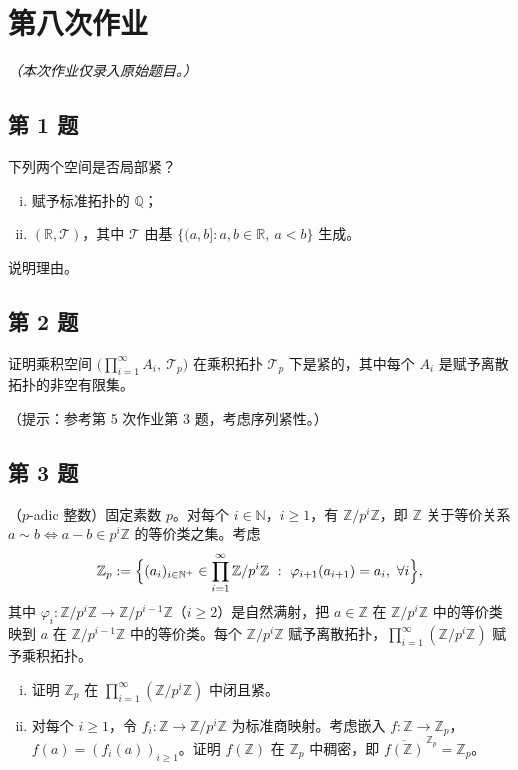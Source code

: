 \documentclass[11pt,a4paper]{article}
\newcommand{\R}{\mathbb{R}}
\newcommand{\Q}{\mathbb{Q}}
\newcommand{\Z}{\mathbb{Z}}
\newcommand{\N}{\mathbb{N}}
\theoremstyle{definition}
\begin{document}
\section{第八次作业}

\textit{（本次作业仅录入原始题目。）}

\subsection{第 1 题}

下列两个空间是否局部紧？
\begin{enumerate}[(i)]
  \item 赋予标准拓扑的 $\Q$；
  \item $(\R, \mathcal{T})$，其中 $\mathcal{T}$ 由基 $\{(a,b] : a, b \in \R,\ a < b\}$ 生成。
\end{enumerate}
说明理由。

\subsection{第 2 题}

证明乘积空间 $\bigl(\prod_{i=1}^{\infty} A_i,\ \mathcal{T}_p\bigr)$ 在乘积拓扑 $\mathcal{T}_p$ 下是紧的，其中每个 $A_i$ 是赋予离散拓扑的非空有限集。

（提示：参考第 5 次作业第 3 题，考虑序列紧性。）

\subsection{第 3 题}

（$p$-adic 整数）固定素数 $p$。对每个 $i \in \N$，$i \ge 1$，有 $\Z/p^i\Z$，即 $\Z$ 关于等价关系 $a \sim b \iff a - b \in p^i\Z$ 的等价类之集。考虑
\[
  \Z_p := \Bigl\{(a_i)_{i \in \N^+} \in \prod_{i=1}^{\infty} \Z/p^i\Z \ :\ \varphi_{i+1}(a_{i+1}) = a_i,\ \forall i \Bigr\},
\]
其中 $\varphi_i : \Z/p^i\Z \to \Z/p^{i-1}\Z$（$i \ge 2$）是自然满射，把 $a \in \Z$ 在 $\Z/p^i\Z$ 中的等价类映到 $a$ 在 $\Z/p^{i-1}\Z$ 中的等价类。每个 $\Z/p^i\Z$ 赋予离散拓扑，$\prod_{i=1}^{\infty}(\Z/p^i\Z)$ 赋予乘积拓扑。
\begin{enumerate}[(i)]
  \item 证明 $\Z_p$ 在 $\prod_{i=1}^{\infty}(\Z/p^i\Z)$ 中闭且紧。
  \item 对每个 $i \ge 1$，令 $f_i : \Z \to \Z/p^i\Z$ 为标准商映射。考虑嵌入 $f : \Z \to \Z_p$，$f(a) = (f_i(a))_{i \ge 1}$。证明 $f(\Z)$ 在 $\Z_p$ 中稠密，即 $\overline{f(\Z)}^{\,\Z_p} = \Z_p$。
\end{enumerate}
\end{document}
